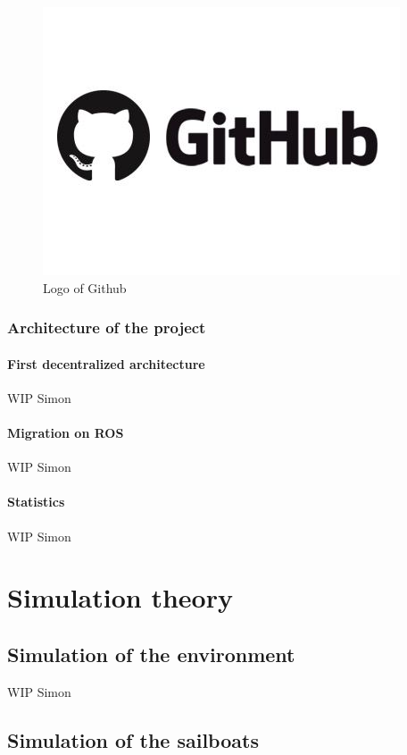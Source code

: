 \documentclass[a4paper]{report}
\begin{document}
\begin{figure}[H]
	\centering
	\includegraphics[width=0.6\linewidth]{image/github.jpg}
	\caption{Logo of Github}
	\label{fig:github_logo}
\end{figure}

\subsection{Architecture of the project}
\subsubsection{First decentralized architecture}

WIP Simon

\subsubsection{Migration on ROS}

WIP Simon

\subsubsection{Statistics}

WIP Simon

\chapter{Simulation theory} \label{section:simulation}
\section{Simulation of the environment}

WIP Simon

\section{Simulation of the sailboats}
\end{document}
